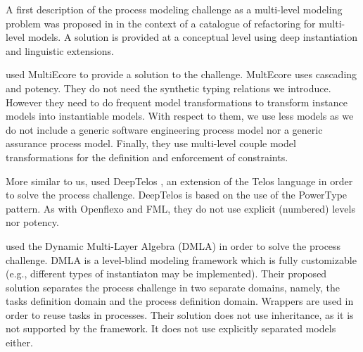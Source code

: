

A first description of the process modeling challenge as a multi-level modeling problem was proposed in \cite{lara2018refactoring} in the context of a catalogue of refactoring for multi-level models. A solution is provided at a conceptual level using deep instantiation and linguistic extensions.

\cite{multiecore2019} used MultiEcore \citep{multecore2016} to provide a solution to the challenge. MultEcore uses cascading and potency. They do not need the synthetic typing relations we introduce. However they need to do frequent model transformations to transform instance models into instantiable models. With respect to them, we use less models as we do not include a generic software engineering process model nor a generic assurance process model. Finally, they use multi-level couple model transformations for the definition and enforcement of constraints.

More similar to us, \cite{deeptelos2019} used DeepTelos \citep{deeptelos2016}, an extension of the Telos language \citep{telos1990} in order to solve the process challenge. DeepTelos is based on the use of the PowerType \citep{atkinson2001essence} pattern. As with Openflexo and FML, they do not use explicit (numbered) levels nor potency.



\cite{dmla2019} used the Dynamic Multi-Layer Algebra (DMLA) \citep{dmla2017} in order to solve the process challenge. DMLA is a level-blind modeling framework which is fully customizable (e.g., different types of instantiaton may be implemented). Their proposed solution separates the process challenge in two separate domains, namely, the tasks definition domain and the process definition domain. Wrappers are used in order to reuse tasks in processes. Their solution does not use inheritance, as it is not supported by the framework. It does not use explicitly separated models either.


